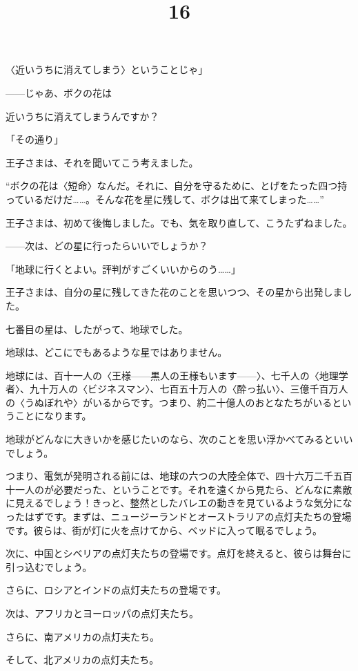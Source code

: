 〈近いうちに消えてしまう〉ということじゃ」


——じゃあ、ボクの花は

近いうちに消えてしまうんですか？

「その通り」

王子さまは、それを聞いてこう考えました。

“ボクの花は〈短命〉なんだ。それに、自分を守るために、とげをたった四つ持っているだけだ……。そんな花を星に残して、ボクは出て来てしまった……”

王子さまは、初めて後悔しました。でも、気を取り直して、こうたずねました。

——次は、どの星に行ったらいいでしょうか？

「地球に行くとよい。評判がすごくいいからのう……」

王子さまは、自分の星に残してきた花のことを思いつつ、その星から出発しました。


\title{16}


七番目の星は、したがって、地球でした。

地球は、どこにでもあるような星ではありません。

地球には、百十一人の〈王様——黒人の王様もいます——〉、七千人の〈地理学者〉、九十万人の〈ビジネスマン〉、七百五十万人の〈酔っ払い〉、三億千百万人の〈うぬぼれや〉がいるからです。つまり、約二十億人のおとなたちがいるということになります。

地球がどんなに大きいかを感じたいのなら、次のことを思い浮かべてみるといいでしょう。

つまり、電気が発明される前には、地球の六つの大陸全体で、四十六万二千五百十一人のが必要だった、ということです。それを遠くから見たら、どんなに素敵に見えるでしょう！きっと、整然としたバレエの動きを見ているような気分になったはずです。まずは、ニュージーランドとオーストラリアの点灯夫たちの登場です。彼らは、街が灯に火を点けてから、ベッドに入って眠るでしょう。

次に、中国とシベリアの点灯夫たちの登場です。点灯を終えると、彼らは舞台に引っ込むでしょう。

さらに、ロシアとインドの点灯夫たちの登場です。

次は、アフリカとヨーロッパの点灯夫たち。

さらに、南アメリカの点灯夫たち。

そして、北アメリカの点灯夫たち。

